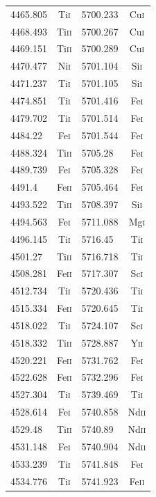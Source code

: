 \begin{longtable}[c]{|l|c|l|c|}
4465.805 & Ti\textsc{i} & 5700.233 & Cu\textsc{i}\\  
4468.493 & Ti\textsc{ii} & 5700.267 & Cu\textsc{i}\\ 
4469.151 & Ti\textsc{ii} & 5700.289 & Cu\textsc{i}\\ 
4470.477 & Ni\textsc{i} & 5701.104 & Si\textsc{i}\\  
4471.237 & Ti\textsc{i} & 5701.105 & Si\textsc{i}\\  
4474.851 & Ti\textsc{i} & 5701.416 & Fe\textsc{i}\\  
4479.702 & Ti\textsc{i} & 5701.514 & Fe\textsc{i}\\  
4484.22 & Fe\textsc{i} & 5701.544 & Fe\textsc{i}\\   
4488.324 & Ti\textsc{ii} & 5705.28 & Fe\textsc{i}\\  
4489.739 & Fe\textsc{i} & 5705.328 & Fe\textsc{i}\\  
4491.4 & Fe\textsc{ii} & 5705.464 & Fe\textsc{i}\\   
4493.522 & Ti\textsc{ii} & 5708.397 & Si\textsc{i}\\ 
4494.563 & Fe\textsc{i} & 5711.088 & Mg\textsc{i}\\  
4496.145 & Ti\textsc{i} & 5716.45 & Ti\textsc{i}\\   
4501.27 & Ti\textsc{ii} & 5716.718 & Ti\textsc{i}\\  
4508.281 & Fe\textsc{ii} & 5717.307 & Sc\textsc{i}\\ 
4512.734 & Ti\textsc{i} & 5720.436 & Ti\textsc{i}\\  
4515.334 & Fe\textsc{ii} & 5720.645 & Ti\textsc{i}\\ 
4518.022 & Ti\textsc{i} & 5724.107 & Sc\textsc{i}\\  
4518.332 & Ti\textsc{ii} & 5728.887 & Y\textsc{ii}\\ 
4520.221 & Fe\textsc{ii} & 5731.762 & Fe\textsc{i}\\ 
4522.628 & Fe\textsc{ii} & 5732.296 & Fe\textsc{i}\\ 
4527.304 & Ti\textsc{i} & 5739.469 & Ti\textsc{i}\\  
4528.614 & Fe\textsc{i} & 5740.858 & Nd\textsc{ii}\\ 
4529.48 & Ti\textsc{ii} & 5740.89 & Nd\textsc{ii}\\  
4531.148 & Fe\textsc{i} & 5740.904 & Nd\textsc{ii}\\ 
4533.239 & Ti\textsc{i} & 5741.848 & Fe\textsc{i}\\  
4534.776 & Ti\textsc{i} & 5741.923 & Fe\textsc{ii}\\ 

\end{longtable}
